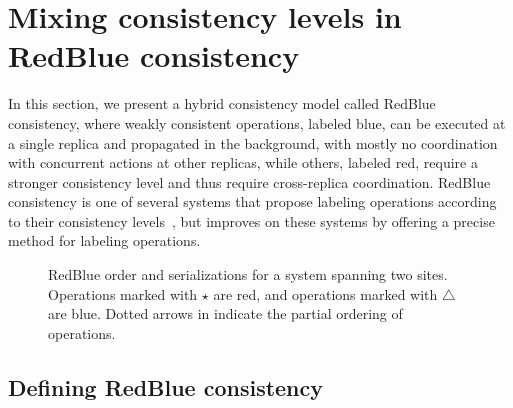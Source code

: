\section{Mixing consistency levels in RedBlue consistency}
\label{sec:redblue}

In this section, we present a hybrid consistency model called RedBlue
consistency, where weakly consistent operations, labeled blue, can be executed at a
single replica and propagated in the background, with mostly no
coordination with concurrent actions at other replicas, while others, labeled red,
require a stronger consistency level and thus require cross-replica
coordination. RedBlue consistency is one of several systems that
propose labeling operations according to their consistency levels~\cite{Ladin1992LazyReplication, Singh2009Zeno,Li2012RedBlue,Pileus}, but improves on these systems by offering a precise method for labeling operations.

\begin{figure}[t!]
\centering
 \begin{minipage}[t]{0.45\columnwidth}
\centering
{}
\end{minipage}
\hfill
 \begin{minipage}[t]{0.45\columnwidth}
\centering
{}
\end{minipage}
\caption{RedBlue order and serializations for a system spanning two
  sites. Operations marked with {\Large $\star$} are red, and
  operations marked with $\bigtriangleup$ are blue. Dotted arrows in \protect{} indicate the partial ordering of
operations. }
\label{fig:expositoryfigure}
\end{figure}

\subsection{Defining RedBlue consistency}

